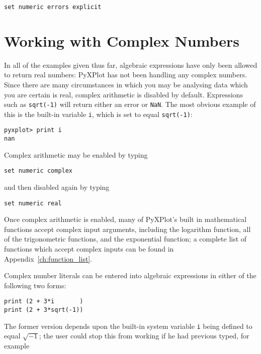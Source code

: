 \begin{verbatim}
set numeric errors explicit
\end{verbatim}

\section{Working with Complex Numbers}
\label{sec:complex_numbers}

In all of the examples given thus far, algebraic expressions have only been
allowed to return real numbers: PyXPlot has not been handling any complex
numbers. Since there are many circumstances in which you may be analysing data
which you are certain is real, complex arithmetic is disabled by default.
Expressions such as {\tt sqrt(-1)} will return either an error or {\tt NaN}.
The most obvious example of this is the built-in variable {\tt i}, which is set
to equal {\tt sqrt(-1)}:

\begin{verbatim}
pyxplot> print i
nan
\end{verbatim}

Complex arithmetic may be enabled by typing

\begin{verbatim}
set numeric complex
\end{verbatim}

\noindent and then disabled again by typing

\begin{verbatim}
set numeric real
\end{verbatim}

Once complex arithmetic is enabled, many of PyXPlot's built in mathematical
functions accept complex input arguments, including the logarithm function, all
of the trigonometric functions, and the exponential function; a complete list
of functions which accept complex inputs can be found in
Appendix~\ref{ch:function_list}.

Complex number literals can be entered into algebraic expressions in either of
the following two forms:

\begin{verbatim}
print (2 + 3*i       )
print (2 + 3*sqrt(-1))
\end{verbatim}

\noindent The former version depends upon the built-in system variable {\tt i}
being defined to equal $\sqrt{-1}$; the user could stop this from working if he
had previous typed, for example

